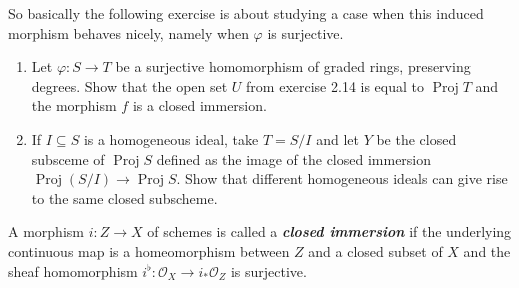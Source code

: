 So basically the following exercise is about studying a case when this induced morphism behaves nicely, namely when $\varphi$ is surjective.

\begin{manualexercise}{3.12}\leavevmode 
	\begin{enumerate}[label=\alph*.]
		\item Let $\varphi:S \to T$ be a surjective homomorphism of graded rings, preserving degrees. Show that the open set $U$ from exercise 2.14 is equal to $\operatorname{Proj}T$ and the morphism $f$ is a closed immersion.

		\item If $I\subseteq S$ is a homogeneous ideal, take $T=S/I$ and let  $Y$ be the closed subsceme of $\operatorname{Proj}S$ defined as the image of the closed immersion $\operatorname{Proj}(S/I)\to \operatorname{Proj}S$. Show that different homogeneous ideals can give rise to the same closed subscheme.
	\end{enumerate}
\end{manualexercise}

\begin{defn}[3.41 Gortz]
	A morphism $i:Z\to X$ of schemes is called a \textit{\textbf{closed immersion}} if the underlying continuous map is a homeomorphism between $Z$ and a closed subset of $X$ and the sheaf homomorphism $i^\flat:\mathcal{O}_X\longrightarrow i_*\mathcal{O}_Z$ is surjective.
\end{defn}


